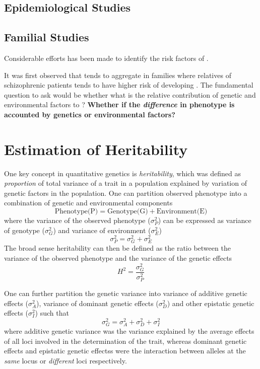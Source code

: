 \documentclass{book}
\newcommand*{\glng}{\glsentrylong}
\begin{document}
	\subsection{Epidemiological Studies}
	
	\subsection{Familial Studies}
	Considerable efforts has been made to identify the risk factors of \glng{scz}.
	
	It was first observed that \glng{scz} tends to aggregate in families where relatives of schizophrenic patients tends to have higher risk of developing \glng{scz}\citep{gottesman1991schizophrenia}. %
	The fundamental question to ask would be whether what is the relative contribution of genetic and environmental factors to \glng{scz}?
	\textbf{Whether if the \emph{difference} in phenotype is accounted by genetics or environmental factors?}
	
	\section{Estimation of Heritability}

	One key concept in quantitative genetics is \emph{heritability}, which was defined as \emph{proportion} of total variance of a trait in a population explained by variation of genetic factors in the population.
	One can partition observed phenotype into a combination of genetic and environmental components\citep{Falconer1996}
	$$
	\text{Phenotype(P)}=\text{Genotype(G)}+\text{Environment(E)}
	$$
	where the variance of the observed phenotype ($\sigma_P^2$) can be expressed as variance of genotype ($\sigma_G^2$) and variance of environment ($\sigma_E^2$)
	$$
		\sigma_P^2=\sigma_G^2+\sigma_E^2
	$$
	The broad sense heritability can then be defined as the ratio between the variance of the observed phenotype and the variance of the genetic effects
	$$
	H^2=\frac{\sigma_G^2}{\sigma_P^2}
	$$
	
	One can further partition the genetic variance into variance of additive genetic effects ($\sigma_A^2$), variance of dominant genetic effects ($\sigma_D^2$) and other epistatic genetic effects ($\sigma_I^2$) such that
	$$
		\sigma_G^2=\sigma_A^2+\sigma_D^2+\sigma_I^2
	$$
	where additive genetic variance was the variance explained by the average effects of all loci involved in the determination of the trait, whereas dominant genetic effects and epistatic genetic effectss were the interaction between alleles at the \emph{same} locus or \emph{different} loci respectively.
	
\end{document}
